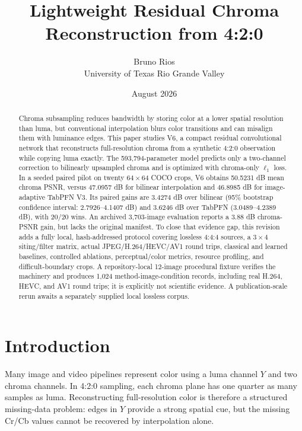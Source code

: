\documentclass[10pt,twocolumn]{article}
\title{\textbf{Lightweight Residual Chroma Reconstruction from 4:2:0}}
\author{Bruno Rios\\
\small University of Texas Rio Grande Valley}
\date{August 2026}
\newcommand{\model}{V6}
\newcommand{\crcb}{Cr/Cb}
\begin{document}
\maketitle

\begin{abstract}
Chroma subsampling reduces bandwidth by storing color at a lower spatial
resolution than luma, but conventional interpolation blurs color transitions and
can misalign them with luminance edges.  This paper studies \model, a compact
residual convolutional network that reconstructs full-resolution chroma from a
synthetic 4:2:0 observation while copying luma exactly.  The 593,794-parameter
model predicts only a two-channel correction to bilinearly upsampled chroma and
is optimized with chroma-only $\ell_1$ loss.  In a seeded paired pilot on twenty
$64\!\times\!64$ COCO crops, \model{} obtains 50.5231 dB mean chroma PSNR,
versus 47.0957 dB for bilinear interpolation and 46.8985 dB for image-adaptive
TabPFN V3.  Its paired gains are 3.4274 dB over bilinear (95\% bootstrap
confidence interval: 2.7926--4.1407 dB) and 3.6246 dB over TabPFN
(3.0489--4.2389 dB), with 20/20 wins.  An archived 3,703-image evaluation reports
a 3.88 dB chroma-PSNR gain, but lacks the original manifest.  To close that
evidence gap, this revision adds a fully local, hash-addressed protocol covering
lossless 4:4:4 sources, a $3\!\times\!4$ siting/filter matrix, actual
JPEG/H.264/HEVC/AV1 round trips, classical and learned baselines, controlled
ablations, perceptual/color metrics, resource profiling, and difficult-boundary
crops.  A repository-local 12-image procedural fixture verifies the machinery and
produces 1,024 method-image-condition records, including real H.264, HEVC, and AV1
round trips; it is explicitly not scientific evidence.  A
publication-scale rerun awaits a separately supplied local lossless corpus.
\end{abstract}

\section{Introduction}

Many image and video pipelines represent color using a luma channel $Y$ and two
chroma channels.  In 4:2:0 sampling, each chroma plane has one quarter as many
samples as luma.  Reconstructing full-resolution color is therefore a structured
missing-data problem: edges in $Y$ provide a strong spatial cue, but the missing
\crcb{} values cannot be recovered by interpolation alone.
\end{document}
